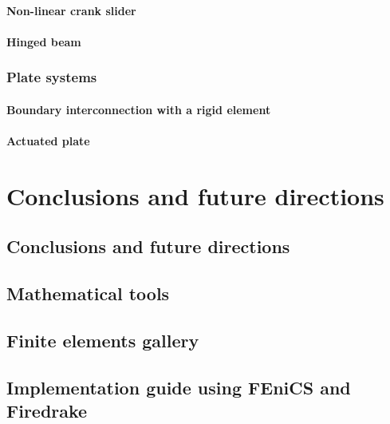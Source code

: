 \documentclass[a4paper,11pt]{book}
\begin{document}
\subsection{Non-linear crank slider}
\subsection{Hinged beam}

\section{Plate systems}
\subsection{Boundary interconnection with a rigid element}
\subsection{Actuated plate}

\part*{Conclusions and future directions}

\chapter*{Conclusions and future directions}


\appendix
\chapter{Mathematical tools}
\chapter{Finite elements gallery}
\chapter{Implementation guide using FEniCS and Firedrake}
\end{document}
